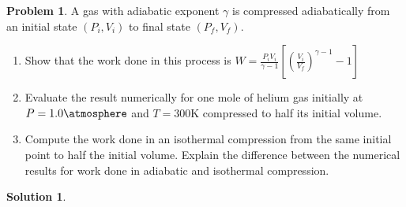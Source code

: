 \documentclass[10pt]{article}
\theoremstyle{definition}
\newtheorem{problem}{Problem}
\newtheorem{soln}{Solution}
\begin{document}
\begin{problem}
A gas with adiabatic exponent $\gamma$ is compressed adiabatically from an initial state $(P_i, V_i)$ to final state $(P_f, V_f)$.
\begin{enumerate}[label=(\alph*)]
  \item Show that the work done in this process is $W=\displaystyle\frac{P_iV_i}{\gamma-1}\left[\left(\frac{V_i}{V_f}\right)^{\gamma-1}-1\right]$
  \item Evaluate the result numerically for one mole of helium gas initially at $P=1.0\unit{\atmosphere}$ and $T=300\unit{\kelvin}$ compressed to half its initial volume.
  \item Compute the work done in an isothermal compression from the same initial point to half the initial volume.
        Explain the difference between the numerical results for work done in adiabatic and isothermal compression.
\end{enumerate}
\end{problem}
\begin{soln}
\end{soln}
\end{document}
